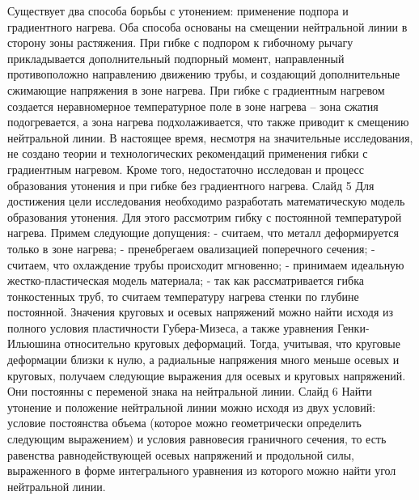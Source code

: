 Существует два способа борьбы с утонением: применение подпора и градиентного нагрева. Оба способа основаны на смещении нейтральной линии в сторону зоны растяжения. При гибке с подпором к гибочному рычагу прикладывается дополнительный подпорный момент, направленный противоположно направлению движению трубы, и создающий дополнительные сжимающие напряжения в зоне нагрева. При гибке с градиентным нагревом создается неравномерное температурное поле в зоне нагрева – зона сжатия подогревается, а зона нагрева подхолаживается, что также приводит к смещению нейтральной линии.
В настоящее время, несмотря на значительные исследования, не создано теории и технологических рекомендаций применения гибки с градиентным нагревом. Кроме того, недостаточно исследован и процесс образования утонения и при гибке без градиентного нагрева. 
Слайд 5
Для достижения цели исследования необходимо разработать математическую модель образования утонения. Для этого рассмотрим гибку с постоянной температурой нагрева.
Примем следующие допущения:
- считаем, что металл деформируется только в зоне нагрева;
- пренебрегаем овализацией поперечного сечения;
- считаем, что охлаждение трубы происходит мгновенно;
- принимаем идеальную жестко-пластическая модель материала;
- так как рассматривается гибка тонкостенных труб, то считаем температуру нагрева стенки по глубине постоянной.
Значения круговых и осевых напряжений можно найти исходя из полного условия пластичности Губера-Мизеса, а также уравнения Генки-Ильюшина относительно круговых деформаций. Тогда, учитывая, что круговые деформации близки к нулю, а радиальные напряжения много меньше осевых и круговых, получаем следующие выражения для осевых и круговых напряжений. Они постоянны с переменой знака на нейтральной линии.
Слайд 6
Найти утонение и положение нейтральной линии можно исходя из двух условий: условие постоянства объема (которое можно геометрически определить следующим выражением) и условия равновесия граничного сечения, то есть равенства равнодействующей осевых напряжений и продольной силы, выраженного в форме интегрального уравнения из которого можно найти угол нейтральной линии.

